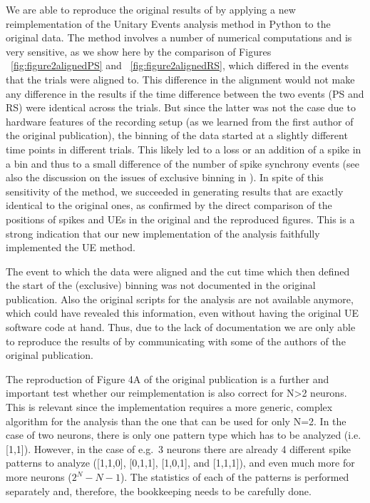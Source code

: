 \documentclass[10pt,a4paper,onecolumn]{article}
\begin{document}
We are able to reproduce the original results of \autocite{Riehle97} by
applying a new reimplementation of the Unitary Events analysis method in
Python to the original data. The method involves a number of numerical
computations and is very sensitive, as we show here by the comparison of
Figures ~\ref{fig:figure2alignedPS} and ~\ref{fig:figure2alignedRS},
which differed in the events that the trials were aligned to. This
difference in the alignment would not make any difference in the results
if the time difference between the two events (PS and RS) were identical
across the trials. But since the latter was not the case due to hardware
features of the recording setup (as we learned from the first author of
the original publication), the binning of the data started at a slightly
different time points in different trials. This likely led to a loss or
an addition of a spike in a bin and thus to a small difference of the
number of spike synchrony events (see also the discussion on the issues
of exclusive binning in \autocite{Gruen99}). In spite of this
sensitivity of the method, we succeeded in generating results that are
exactly identical to the original ones, as confirmed by the direct
comparison of the positions of spikes and UEs in the original and the
reproduced figures. This is a strong indication that our new
implementation of the analysis faithfully implemented the UE method.

The event to which the data were aligned and the cut time which then
defined the start of the (exclusive) binning was not documented in the
original publication. Also the original scripts for the analysis are not
available anymore, which could have revealed this information, even
without having the original UE software code at hand. Thus, due to the
lack of documentation we are only able to reproduce the results of
\autocite{Riehle97} by communicating with some of the authors of the
original publication.

The reproduction of Figure 4A of the original publication is a further
and important test whether our reimplementation is also correct for
N\textgreater{}2 neurons. This is relevant since the implementation
requires a more generic, complex algorithm for the analysis than the one
that can be used for only N=2. In the case of two neurons, there is only
one pattern type which has to be analyzed (i.e. {[}1,1{]}). However, in
the case of e.g.~3 neurons there are already 4 different spike patterns
to analyze ({[}1,1,0{]}, {[}0,1,1{]}, {[}1,0,1{]}, and {[}1,1,1{]}), and
even much more for more neurons (\(2^{N}-N-1\)). The statistics of each
of the patterns is performed separately and, therefore, the bookkeeping
needs to be carefully done.
\end{document}
